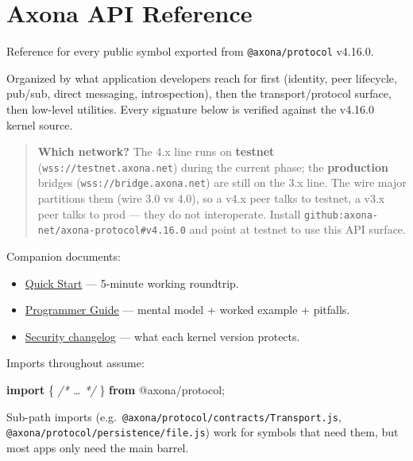 \documentclass[
  nobib]{tufte-handout}
\author{}
\date{}
\newenvironment{Shaded}{}{}
\newcommand{\CommentTok}[1]{\textcolor[rgb]{0.38,0.63,0.69}{\textit{#1}}}
\newcommand{\ImportTok}[1]{\textcolor[rgb]{0.00,0.50,0.00}{\textbf{#1}}}
\newcommand{\NormalTok}[1]{#1}
\newcommand{\OperatorTok}[1]{\textcolor[rgb]{0.40,0.40,0.40}{#1}}
\newcommand{\StringTok}[1]{\textcolor[rgb]{0.25,0.44,0.63}{#1}}
\providecommand{\tightlist}{%
  \setlength{\itemsep}{0pt}\setlength{\parskip}{0pt}}
\begin{document}
\section{Axona API Reference}\label{axona-api-reference}

Reference for every public symbol exported from \texttt{@axona/protocol}
v4.16.0.

Organized by what application developers reach for first (identity, peer
lifecycle, pub/sub, direct messaging, introspection), then the
transport/protocol surface, then low-level utilities. Every signature
below is verified against the v4.16.0 kernel source.

\begin{quote}
\textbf{Which network?} The 4.x line runs on \textbf{testnet}
(\texttt{wss://testnet.axona.net}) during the current phase; the
\textbf{production} bridges (\texttt{wss://bridge.axona.net}) are still
on the 3.x line. The wire major partitions them (wire 3.0 vs 4.0), so a
v4.x peer talks to testnet, a v3.x peer talks to prod --- they do not
interoperate. Install \texttt{github:axona-net/axona-protocol\#v4.16.0}
and point at testnet to use this API surface.
\end{quote}

Companion documents:

\begin{itemize}
\tightlist
\item
  \href{Quick-Start-v4.16.0.md}{Quick Start} --- 5-minute working
  roundtrip.
\item
  \href{Axona-Programmer-Guide-v4.16.0.md}{Programmer Guide} --- mental
  model + worked example + pitfalls.
\item
  \href{../SECURITY-CHANGELOG.md}{Security changelog} --- what each
  kernel version protects.
\end{itemize}

Imports throughout assume:

\begin{Shaded}
\begin{Highlighting}[]
\ImportTok{import}\NormalTok{ \{ }\CommentTok{/* … */}\NormalTok{ \} }\ImportTok{from} \StringTok{\textquotesingle{}@axona/protocol\textquotesingle{}}\OperatorTok{;}
\end{Highlighting}
\end{Shaded}

Sub-path imports (e.g.~\texttt{@axona/protocol/contracts/Transport.js},
\texttt{@axona/protocol/persistence/file.js}) work for symbols that need
them, but most apps only need the main barrel.
\end{document}
